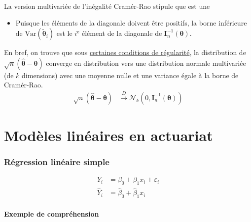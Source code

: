 \documentclass[10pt, french]{article}
\begin{document}
\begin{multicols*}{2}
La version multivariée de l'inégalité Cramér-Rao stipule que  est une 
\begin{itemize}
	\item	Puisque les éléments de la diagonale doivent être positifs, la borne inférieure de $\text{Var}(\tilde{\bm{\theta}}_{i})$ est le $i^{\text{e}}$ élément de la diagonale de $\bm{I}^{-1}_{n}(\bm{\theta})$.
\end{itemize}
	
En bref, on trouve que sous \hyperlink{reg_cond}{\color{blue!40!green!80!black}certaines conditions de régularité}, la distribution de $\sqrt{n}\left( \hat{\bm{\theta}}	-	\bm{\theta} \right)$ converge en distribution vers une distribution normale multivariée (de $k$ dimensions) avec une moyenne nulle et une variance égale à la borne de Cramér-Rao.
\begin{align*}
	\sqrt{n}\left( \hat{\bm{\theta}}	-	\bm{\theta} \right)
	&\overset{D}{\rightarrow}
	\mathcal{N}_{k}\left( 0, \bm{I}^{-1}_{n}(\bm{\theta}) \right)
\end{align*}



\pagebreak

\part{Modèles linéaires en actuariat}

\section{Régression linéaire simple}

\begin{definitionNOHFILL}
\begin{align*}
	Y_{i} 
	&=	\beta_{0} + \beta_{1} x_{i} + \varepsilon_{i}	\\
	\hat{Y}_{i} 
	&=	\hat{\beta}_{0} + \hat{\beta}_{1} x_{i} 
\end{align*}
\end{definitionNOHFILL}

\subsection{Exemple de compréhension}


\end{multicols*}
\end{document}
